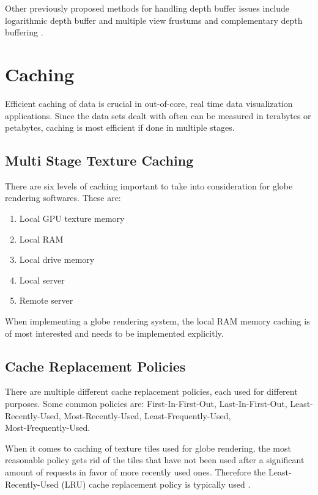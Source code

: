 Other previously proposed methods for handling depth buffer issues include logarithmic depth buffer and multiple view frustums and complementary depth buffering \cite{cozzi11}.

\section{Caching}

Efficient caching of data is crucial in out-of-core, real time data visualization applications. Since the data sets dealt with often can be measured in terabytes or petabytes, caching is most efficient if done in multiple stages.

\subsection{Multi Stage Texture Caching}
There are six levels of caching important to take into consideration for globe rendering softwares. These are:

\begin{enumerate}
\item Local GPU texture memory
\item Local RAM
\item Local drive memory
\item Local server
\item Remote server
\end{enumerate}

When implementing a globe rendering system, the local RAM memory caching is of most interested and needs to be implemented explicitly.

\subsection{Cache Replacement Policies}
There are multiple different cache replacement policies, each used for different purposes. Some common policies are: First-In-First-Out, Last-In-First-Out, Least-Recently-Used, Most-Recently-Used, Least-Frequently-Used, \\ Most-Frequently-Used.

When it comes to caching of texture tiles used for globe rendering, the most reasonable policy gets rid of the tiles that have not been used after a significant amount of requests in favor of more recently used ones. Therefore the Least-Recently-Used (LRU) cache replacement policy is typically used \cite[p. 386]{cozzi11}.

